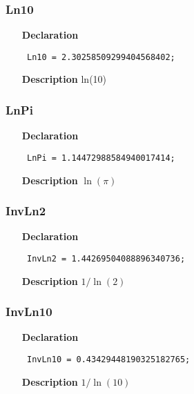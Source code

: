 \documentclass[12pt,a4paper,oneside]{report}
\newcommand{\declarationitem}[1]{\textbf{#1}}
\newcommand{\descriptiontitle}[1]{\textbf{#1}}
\newcommand{\code}[1]{\texttt{#1}}
\begin{document}
\subsubsection{Ln10}
\label{utypes-Ln10}
\begin{itemize}\item[\declarationitem{Declaration}\hfill]
	\begin{flushleft}
		\code{
			Ln10       = 2.30258509299404568402;}
		
	\end{flushleft}
	
	\par
	\item[\descriptiontitle{Description}]
	ln(10)
	
\end{itemize}
\subsubsection{LnPi}
\label{utypes-LnPi}
\begin{itemize}\item[\declarationitem{Declaration}\hfill]
	\begin{flushleft}
		\code{
			LnPi       = 1.14472988584940017414;}
		
	\end{flushleft}
	
	\par
	\item[\descriptiontitle{Description}]
	$\ln(\pi)$
	
\end{itemize}
\subsubsection{InvLn2}
\label{utypes-InvLn2}
\begin{itemize}\item[\declarationitem{Declaration}\hfill]
	\begin{flushleft}
		\code{
			InvLn2     = 1.44269504088896340736;}
		
	\end{flushleft}
	
	\par
	\item[\descriptiontitle{Description}]
	$1/\ln(2)$
	
\end{itemize}
\subsubsection{InvLn10}
\label{utypes-InvLn10}
\begin{itemize}\item[\declarationitem{Declaration}\hfill]
	\begin{flushleft}
		\code{
			InvLn10    = 0.43429448190325182765;}
		
	\end{flushleft}
	
	\par
	\item[\descriptiontitle{Description}]
	$1/\ln(10)$
	
\end{itemize}
\end{document}
